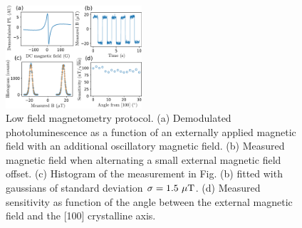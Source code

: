\documentclass[preprintnumbers,amsmath,amssymb,superscriptaddress,twocolumn,showpacs]{revtex4-2}
\begin{document}
%
%
%
%

\begin{figure}
\includegraphics[width=0.45\textwidth]{Figures/fig_magneto}
\caption{Low field magnetometry protocol. (a) Demodulated photoluminescence as a function of an externally applied magnetic field with an additional oscillatory magnetic field. (b) Measured magnetic field when alternating a small external magnetic field offset. (c) Histogram of the measurement in Fig. (b) fitted with gaussians of standard deviation $\sigma=1.5\ \mu \rm T$. (d) Measured sensitivity as function of the angle between the external magnetic field and the [100] crystalline axis.}
\label{magneto}
\end{figure}
%
\end{document}
